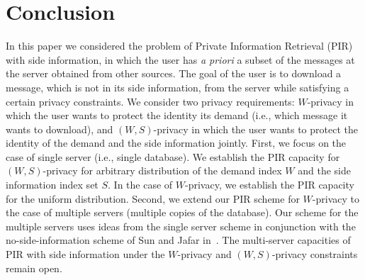 \documentclass[letterpaper, 10 pt, conference]{ieeeconf}
\begin{document}
\section{Conclusion}
\label{sec:conclusion}

In this paper we considered the problem  of 
Private Information Retrieval (PIR) with side information, in which the user has {\it a priori}  a subset of the messages at the server obtained from other sources. The goal of the user is to download a message, which  is not in its side information, from the server while satisfying a certain privacy constraints. We consider two privacy requirements: $W$-privacy in which the user wants to protect the identity its demand  (i.e., which message it wants to download), and $(W,S)$-privacy in which the user wants to protect the identity of the demand and  the side information  jointly. First, we focus on the case of single server (i.e., single database). We establish the PIR capacity for $(W,S)$-privacy for arbitrary distribution of the demand index $W$ and the side information index set $S$. %
In the case of $W$-privacy, we establish the  PIR capacity  for the uniform distribution. Second, we extend our PIR scheme for $W$-privacy to the case of multiple servers (multiple copies of the database). Our scheme for the multiple servers uses ideas from the single server scheme in conjunction with the no-side-information scheme of Sun and Jafar in~\cite{sun2016capacitynoncol}. The multi-server capacities of PIR with side information under the  $W$-privacy and $(W,S)$-privacy constraints remain open.






\end{document}
